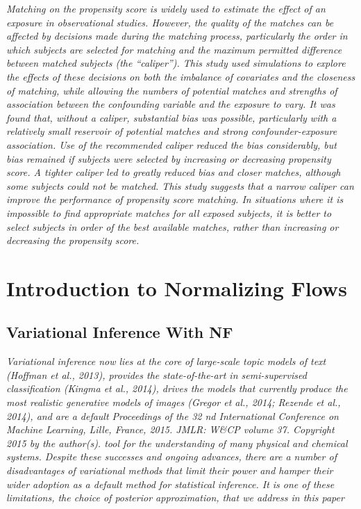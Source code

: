 \documentclass[
  11pt,
]{book}
\begin{document}
\emph{Matching on the propensity score is widely used to estimate the effect of an exposure in observational studies. However, the quality of the matches can be affected by decisions made during the matching process, particularly the order in which subjects are selected for matching and the maximum permitted difference between matched subjects (the ``caliper''). This study used simulations to explore the effects of these decisions on both the imbalance of covariates and the closeness of matching, while allowing the numbers of potential matches and strengths of association between the confounding variable and the exposure to vary. It was found that, without a caliper, substantial bias was possible, particularly with a relatively small reservoir of potential matches and strong confounder-exposure association. Use of the recommended caliper reduced the bias considerably, but bias remained if subjects were selected by increasing or decreasing propensity score. A tighter caliper led to greatly reduced bias and closer matches, although some subjects could not be matched. This study suggests that a narrow caliper can improve the performance of propensity score matching. In situations where it is impossible to find appropriate matches for all exposed subjects, it is better to select subjects in order of the best available matches, rather than increasing or decreasing the propensity score.}

\hypertarget{introduction-to-normalizing-flows}{%
\chapter{Introduction to Normalizing Flows}\label{introduction-to-normalizing-flows}}

\hypertarget{variational-inference-with-nf}{%
\section{Variational Inference With NF}\label{variational-inference-with-nf}}

\emph{Variational inference now lies at the core of large-scale topic models of text (Hoffman et al., 2013), provides the state-of-the-art in semi-supervised classification (Kingma et al., 2014), drives the models that currently produce the most realistic generative models of images (Gregor et al., 2014; Rezende et al., 2014), and are a default Proceedings of the 32 nd International Conference on Machine Learning, Lille, France, 2015. JMLR: W\&CP volume 37. Copyright 2015 by the author(s). tool for the understanding of many physical and chemical systems. Despite these successes and ongoing advances, there are a number of disadvantages of variational methods that limit their power and hamper their wider adoption as a default method for statistical inference. It is one of these limitations, the choice of posterior approximation, that we address in this paper}
\end{document}
